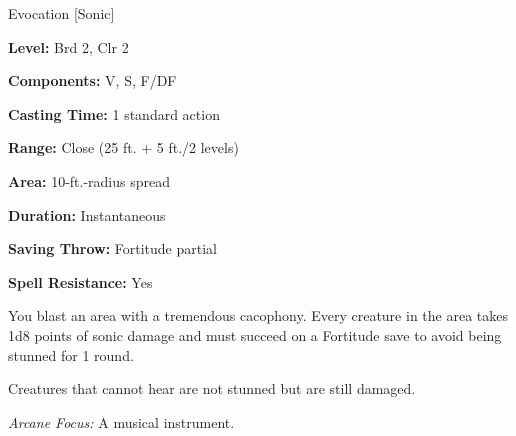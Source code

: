 
Evocation [Sonic]

\textbf{Level:} Brd 2, Clr 2

\textbf{Components:} V, S, F/DF

\textbf{Casting Time:} 1 standard action

\textbf{Range:} Close (25 ft. + 5 ft./2 levels)

\textbf{Area:} 10-ft.-radius spread

\textbf{Duration:} Instantaneous

\textbf{Saving Throw:} Fortitude partial

\textbf{Spell Resistance:} Yes

You blast an area with a tremendous cacophony. Every creature in the area takes 
1d8 points of sonic damage and must succeed on a Fortitude save to avoid being 
stunned for 1 round. 

Creatures that cannot hear are not stunned but are still damaged.

\textit{Arcane Focus:} A musical instrument.

